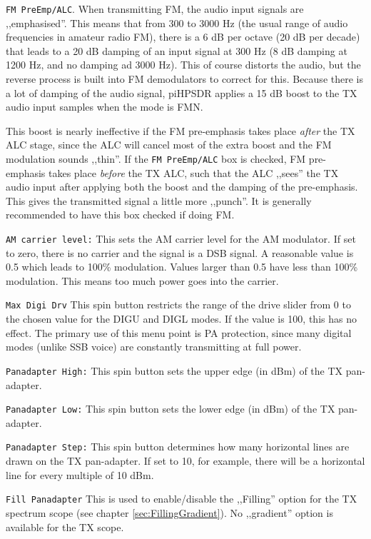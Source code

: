 \documentclass[12pt]{book}
\def\rett#1{\texttt{\color{red}#1}}
\def\pH{pi\-HPSDR\xspace}
\begin{document}
\rett{FM PreEmp/ALC}. When transmitting FM, the audio input signals are ,,emphasised''.
This means that from 300 to 3000 Hz (the usual range of audio frequencies in amateur
radio FM), there is a 6 dB per octave (20 dB per decade) that leads to a 20 dB damping
of an input signal at 300 Hz (8 dB damping at 1200 Hz, and no damping ad 3000 Hz).
This of course distorts the audio, but the reverse process is built into FM demodulators
to correct for this. Because there is a lot of damping of the audio signal, \pH
applies a 15 dB boost to the TX audio input samples when the mode is FMN.

This boost is nearly ineffective if the FM pre-emphasis takes place \textit{after}
the TX ALC stage, since the ALC will cancel most of the extra boost and the FM
modulation sounds ,,thin''. If the \rett{FM PreEmp/ALC} box is checked, FM
pre-emphasis takes place \textit{before} the TX ALC, such that the ALC ,,sees''
the TX audio input after applying both the boost and the damping of the pre-emphasis. This gives the
transmitted signal a little more ,,punch''. It is generally recommended to have this box checked
if doing FM.

\rett{AM carrier level:} This sets the AM carrier level for the AM modulator. If set to zero, there is no
carrier and the
signal is a DSB signal. A reasonable value is 0.5 which leads to 100\% modulation. Values larger than
0.5 have less than 100\% modulation. This means too much power goes into the carrier.

\rett{Max Digi Drv} This spin button restricts the range of the drive slider from 0 to the
chosen value
for the DIGU and DIGL modes. If the value is 100, this has no effect. The primary use of this menu point is
PA protection,
since many digital modes (unlike SSB voice) are constantly transmitting at full power.

\rett{Panadapter High:} This spin button sets the upper edge (in dBm) of the TX pan-adapter.

\rett{Panadapter Low:} This spin button sets the lower edge (in dBm) of the TX pan-adapter.

\rett{Panadapter Step:} This spin button determines how many horizontal lines are drawn on the
TX pan-adapter. If set to 10, for example, there will be a horizontal line for every multiple
of 10 dBm.

\rett{Fill Panadapter} This is used to enable/disable the ,,Filling'' option
for the TX  spectrum scope (see chapter \ref{sec:FillingGradient}). No ,,gradient''
option is available for the TX scope.
\end{document}
